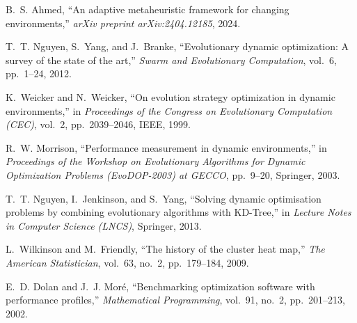 \documentclass[10pt]{article}
\begin{document}
\begin{thebibliography}{99}

B.~S. Ahmed,
``An adaptive metaheuristic framework for changing environments,''
\emph{arXiv preprint arXiv:2404.12185}, 2024.

T.~T. Nguyen, S.~Yang, and J.~Branke,
``Evolutionary dynamic optimization: A survey of the state of the art,''
\emph{Swarm and Evolutionary Computation}, vol.~6, pp.~1--24, 2012.


K.~Weicker and N.~Weicker,
``On evolution strategy optimization in dynamic environments,''
in \emph{Proceedings of the Congress on Evolutionary Computation (CEC)}, vol.~2, pp.~2039--2046, IEEE, 1999.

R.~W. Morrison,
``Performance measurement in dynamic environments,''
in \emph{Proceedings of the Workshop on Evolutionary Algorithms for Dynamic Optimization Problems (EvoDOP-2003) at GECCO}, pp.~9--20, Springer, 2003.

T.~T. Nguyen, I.~Jenkinson, and S.~Yang,
``Solving dynamic optimisation problems by combining evolutionary algorithms with KD-Tree,''
in \emph{Lecture Notes in Computer Science (LNCS)}, Springer, 2013.

L.~Wilkinson and M.~Friendly,
``The history of the cluster heat map,''
\emph{The American Statistician}, vol.~63, no.~2, pp.~179--184, 2009.

E.~D. Dolan and J.~J. Mor{\'e},
``Benchmarking optimization software with performance profiles,''
\emph{Mathematical Programming}, vol.~91, no.~2, pp.~201--213, 2002.

\end{thebibliography}
\end{document}
